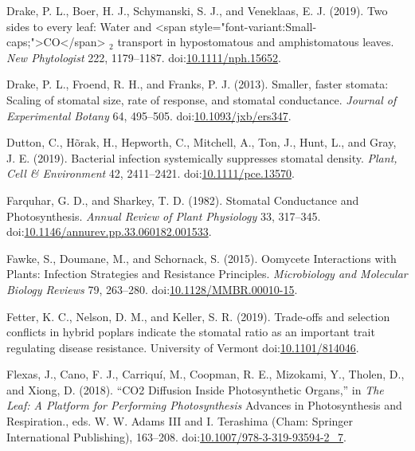 \documentclass[utf8]{frontiersSCNS}
\newlength{\cslhangindent}
\newenvironment{cslreferences}%
  {\setlength{\parindent}{0pt}%
  \everypar{\setlength{\hangindent}{\cslhangindent}}\ignorespaces}%
  {\par}
\begin{document}
\begin{cslreferences}
\leavevmode\hypertarget{ref-drake_two_2019}{}%
Drake, P. L., Boer, H. J., Schymanski, S. J., and Veneklaas, E. J.
(2019). Two sides to every leaf: Water and \textless span
style="font-variant:Small-caps;"\textgreater CO\textless/span\textgreater{}
\(_{\textrm{2}}\) transport in hypostomatous and amphistomatous leaves.
\emph{New Phytologist} 222, 1179--1187.
doi:\href{https://doi.org/10.1111/nph.15652}{10.1111/nph.15652}.

\leavevmode\hypertarget{ref-drake_smaller_2013}{}%
Drake, P. L., Froend, R. H., and Franks, P. J. (2013). Smaller, faster
stomata: Scaling of stomatal size, rate of response, and stomatal
conductance. \emph{Journal of Experimental Botany} 64, 495--505.
doi:\href{https://doi.org/10.1093/jxb/ers347}{10.1093/jxb/ers347}.

\leavevmode\hypertarget{ref-dutton_bacterial_2019}{}%
Dutton, C., Hõrak, H., Hepworth, C., Mitchell, A., Ton, J., Hunt, L.,
and Gray, J. E. (2019). Bacterial infection systemically suppresses
stomatal density. \emph{Plant, Cell \& Environment} 42, 2411--2421.
doi:\href{https://doi.org/10.1111/pce.13570}{10.1111/pce.13570}.

\leavevmode\hypertarget{ref-farquhar_stomatal_1982}{}%
Farquhar, G. D., and Sharkey, T. D. (1982). Stomatal Conductance and
Photosynthesis. \emph{Annual Review of Plant Physiology} 33, 317--345.
doi:\href{https://doi.org/10.1146/annurev.pp.33.060182.001533}{10.1146/annurev.pp.33.060182.001533}.

\leavevmode\hypertarget{ref-fawke_oomycete_2015}{}%
Fawke, S., Doumane, M., and Schornack, S. (2015). Oomycete Interactions
with Plants: Infection Strategies and Resistance Principles.
\emph{Microbiology and Molecular Biology Reviews} 79, 263--280.
doi:\href{https://doi.org/10.1128/MMBR.00010-15}{10.1128/MMBR.00010-15}.

\leavevmode\hypertarget{ref-fetter_trade-offs_2019}{}%
Fetter, K. C., Nelson, D. M., and Keller, S. R. (2019). Trade-offs and
selection conflicts in hybrid poplars indicate the stomatal ratio as an
important trait regulating disease resistance. University of Vermont
doi:\href{https://doi.org/10.1101/814046}{10.1101/814046}.

\leavevmode\hypertarget{ref-flexas_co2_2018}{}%
Flexas, J., Cano, F. J., Carriquí, M., Coopman, R. E., Mizokami, Y.,
Tholen, D., and Xiong, D. (2018). ``CO2 Diffusion Inside Photosynthetic
Organs,'' in \emph{The Leaf: A Platform for Performing Photosynthesis}
Advances in Photosynthesis and Respiration., eds. W. W. Adams III and I.
Terashima (Cham: Springer International Publishing), 163--208.
doi:\href{https://doi.org/10.1007/978-3-319-93594-2_7}{10.1007/978-3-319-93594-2\_7}.


\end{cslreferences}
\end{document}
